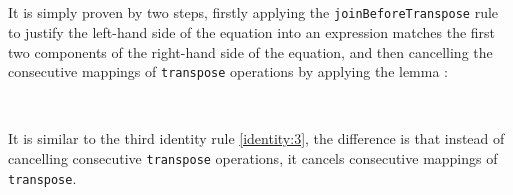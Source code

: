 \documentclass{l4proj}
\begin{document}
\begin{code}
\AgdaSpace{}%
\AgdaSymbol{))}\<%
\\
%
\>[2]\AgdaSpace{}%
\AgdaSpace{}%
\AgdaSymbol{(}\AgdaSpace{}%
\AgdaSpace{}%
\AgdaSymbol{)}\AgdaSpace{}%
\<%
\\
\>[2][@{}l@{\AgdaIndent{0}}]%
\>[4]\AgdaSpace{}%
\AgdaSpace{}%
\AgdaSymbol{(}\AgdaSpace{}%
\AgdaSymbol{(}\AgdaSpace{}%
\AgdaSpace{}%
\AgdaSymbol{(}\AgdaSpace{}%
\AgdaSpace{}%
\AgdaSymbol{)))}\<%
\\
%
\>[2]\AgdaSpace{}%
\AgdaSpace{}%
\AgdaSpace{}%
\AgdaSpace{}%
\AgdaSpace{}%
\AgdaSpace{}%
\AgdaSpace{}%
\AgdaSymbol{(}\AgdaSpace{}%
\AgdaSymbol{))}\AgdaSpace{}%
\AgdaSymbol{(}\AgdaSpace{}%
\AgdaSymbol{)}\AgdaSpace{}%
\<%
\\
\>[2][@{}l@{\AgdaIndent{0}}]%
\>[4]\<%
\end{code}
It is simply proven by two steps, firstly applying the \texttt{joinBeforeTranspose} rule to justify the left-hand side of the equation into an expression matches the first two components of the right-hand side of the equation, and then cancelling the consecutive mappings of \texttt{transpose} operations by applying the lemma :
\begin{code}%
\>[0]\AgdaSpace{}%
\AgdaSymbol{:}%
\>[553I]\AgdaSymbol{\{}\AgdaSpace{}%
\AgdaSpace{}%
\AgdaSpace{}%
\AgdaSymbol{:}\AgdaSpace{}%
\AgdaSymbol{\}}\AgdaSpace{}%
\AgdaSpace{}%
\AgdaSymbol{\{}\AgdaSpace{}%
\AgdaSymbol{:}\AgdaSpace{}%
\AgdaSymbol{\}}\AgdaSpace{}%
\AgdaSpace{}%
\AgdaSymbol{(}\AgdaSpace{}%
\AgdaSymbol{:}\AgdaSpace{}%
\AgdaSpace{}%
\AgdaSymbol{(}\AgdaSpace{}%
\AgdaSymbol{(}\AgdaSpace{}%
\AgdaSpace{}%
\AgdaSymbol{)}\AgdaSpace{}%
\AgdaSymbol{)}\AgdaSpace{}%
\AgdaSymbol{)}\AgdaSpace{}%
\<%
\\
\>[.][@{}l@{}]\<[553I]%
\>[23]\AgdaSpace{}%
\AgdaSpace{}%
\AgdaSymbol{(}\AgdaSpace{}%
\AgdaSpace{}%
\AgdaSymbol{)}\AgdaSpace{}%
\AgdaSpace{}%
\<%
\end{code}
It is similar to the third identity rule \ref{identity:3}, the difference is that instead of cancelling consecutive \texttt{transpose} operations, it cancels consecutive mappings of \texttt{transpose}.
\end{document}
